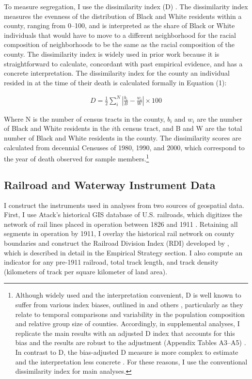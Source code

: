 \documentclass[11pt]{article}
\begin{document}
To measure segregation, I use the dissimilarity index (D) \citep{duncan_methodological_1955}.
The dissimilarity index measures the evenness of the distribution of Black and White residents within a county, ranging from 0--100, and is interpreted as the share of Black or White individuals that would have to move to a different neighborhood for the racial composition of neighborhoods to be the same as the racial composition of the county.
The dissimilarity index is widely used in prior work \citep{hendi_where_2024,light_segregation_2019,massey_american_1993,cutler_are_1997} because it is straightforward to calculate, concordant with past empirical evidence, and has a concrete interpretation. The dissimilarity index for the county an individual resided in at the time of their death is calculated formally in Equation (1):

\begin{align} 
D = \frac 1 2 \sum_i^N | \frac{b_i}{B} - \frac{w_i}{W}| \times 100 
\end{align}

Where N is the number of census tracts in the county, $b_i$ and $w_i$ are the number of Black and White residents in the $i$th census tract, and B and W are the total number of Black and White residents in the county.
The dissimilarity scores are calculated from decennial Censuses of 1980, 1990, and 2000, which correspond to the year of death observed for sample members.\footnote{Although widely used and the interpretation convenient, D is well known to suffer from various index biases, outlined in \citet{fossett_new_2017} and others \citep{winship_revaluation_1977,carrington_measuring_1997}, particularly as they relate to temporal comparisons and variability in the population composition and relative group size of counties. Accordingly, in supplemental analyses, I replicate the main results with an adjusted D index that accounts for this bias and the results are robust to the adjustment (Appendix Tables A3--A5) \citep{fossett_new_2017}. In contrast to D, the bias-adjusted D measure is more complex to estimate and the interpretation less concrete \citep[p.~233]{fossett_new_2017}. For these reasons, I use the conventional dissimilarity index for main analyses.} 

\subsection{Railroad and Waterway Instrument Data}

I construct the instruments used in analyses from two sources of geospatial data.
First, I use Atack's historical GIS database of U.S. railroads, which digitizes the network of rail lines placed in operation between 1826 and 1911 \citeyearpar{atack_historical_2016}.
Retaining all segments in operation by 1911, I overlay the historical rail network on county boundaries and construct the Railroad Division Index (RDI) developed by \citet{ananat_wrong_2011}, which is described in detail in the Empirical Strategy section. I also compute an indicator for any pre-1911 railroad, total track length, and track density (kilometers of track per square kilometer of land area).
\end{document}
